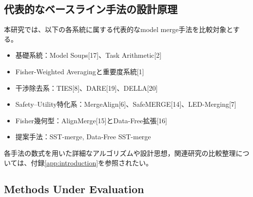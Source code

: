 \documentclass{article}
\begin{document}
\subsection{代表的なベースライン手法の設計原理}
本研究では、以下の各系統に属する代表的なmodel merge手法を比較対象とする。
\begin{itemize}
    \item 基礎系統：Model Soups[17]、Task Arithmetic[2]
    \item Fisher-Weighted Averagingと重要度系統[1]
    \item 干渉除去系：TIES[8]、DARE[19]、DELLA[20]
    \item Safety--Utility特化系：MergeAlign[6]、SafeMERGE[14]、LED-Merging[7]
    \item Fisher幾何型：AlignMerge[15]とData-Free拡張[16]
    \item 提案手法：SST-merge, Data-Free SST-merge
\end{itemize}
各手法の数式を用いた詳細なアルゴリズムや設計思想，関連研究の比較整理については、付録\ref{app:introduction}を参照されたい。


\subsection{Methods Under Evaluation}
\end{document}
